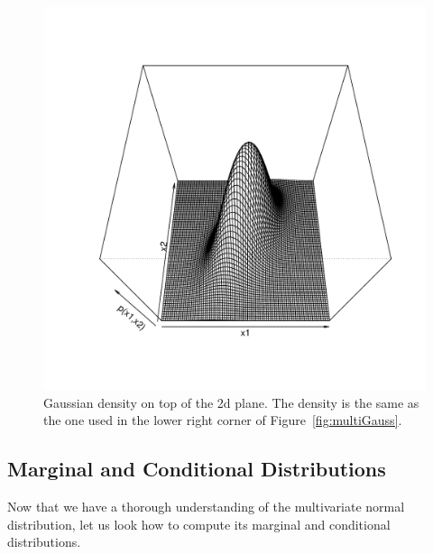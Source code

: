 \documentclass[a4paper,11pt,leqno]{report}\usepackage[]{graphicx}\usepackage[]{color}
\makeatletter
\def\maxwidth{ %
  \ifdim\Gin@nat@width>\linewidth
    \linewidth
  \else
    \Gin@nat@width
  \fi
}
\newenvironment{knitrout}{}{} %
\makeatother
\begin{document}
\begin{figure}
\begin{knitrout}
\color{fgcolor}
\includegraphics[width=\maxwidth]{figures/3dgauss-1} 

\end{knitrout}
\caption{Gaussian density on top of the 2d plane. The density is the same as the one used in the lower right corner of Figure~\ref{fig:multiGauss}.}
\label{fig:3dgauss}
\end{figure}

\subsection{Marginal and Conditional Distributions}

Now that we have a thorough understanding of the multivariate normal distribution, let us look how to compute its marginal and conditional distributions.
\end{document}
